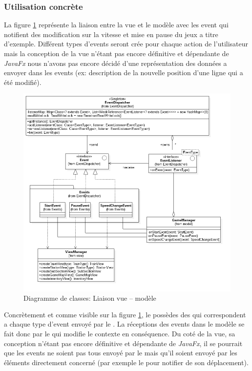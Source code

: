 \documentclass[report, backcover, french, nodocumentinfo]{upmethodology-document}
\begin{document}
			\subsubsection{Utilisation concrète}
				\p{}
					La figure \ref{fig:ViewModelLinkClassDiagram} représente la liaison entre la vue et le modèle avec les event qui notifient des modification sur la vitesse et mise en pause du jeux a titre d'exemple. Différent types d'events seront crée pour chaque action de l'utilisateur mais la conception de la vue n'étant pas encore définitive et dépendante de \textit{JavaFx} nous n'avons pas encore décidé d'une représentation des données a envoyer dans les events (ex: description de la nouvelle position d'une ligne qui a été modifié).
					\begin{figure}[h!]
						\centering
						\includegraphics[width=\textwidth]{figures/ViewModelLinkClassDiagram}
						\caption{Diagramme de classes: Liaison vue -- modèle}
						\label{fig:ViewModelLinkClassDiagram}
					\end{figure}
				\p{}
					Concrètement et comme visible sur la figure \ref{fig:ViewModelLinkClassDiagram}, le  possèdes des  qui correspondent a chaque type d'event envoyé par le . La réceptions des events dans le modèle se fait donc par le  qui modifie le contexte en conséquence. Du coté de la vue, sa conception n'étant pas encore définitive et dépendante de \textit{JavaFx}, il se pourrait que les events ne soient pas tous envoyé par le  mais qu'il soient envoyé par les éléments directement concerné (par exemple le  pour notifier de son déplacement).
\end{document}
